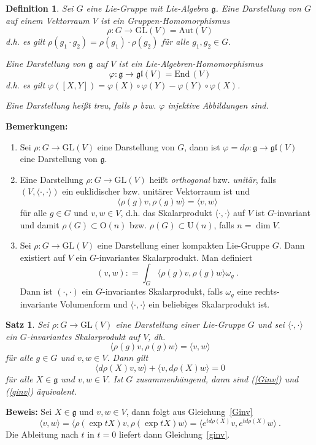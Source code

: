 \documentclass[12pt,a4paper]{article}
\def\O{\mathrm{O}}
\def\GL{\mathrm{GL}}
\def\U{\mathrm{U}}
\def\End{\mathrm{End}\,}
\def\g{\mathfrak{g}}
\def\Aut{\mathrm{Aut}}
\def\la{\langle}
\def\ra{\rangle}
\def\gl{\mathfrak{gl}}
\newtheorem{Satz}[Lemma]{Satz}
\newtheorem{Definition}[Lemma]{Definition}
\def\proof{\noindent\textbf{Beweis:}\quad}
\begin{document}
\bigskip

\begin{Definition}
Sei $G$ eine Lie-Gruppe mit Lie-Algebra $\g$. Eine {\em Darstellung von $G$} auf einem Vektorraum
$V$ ist ein Gruppen-Homomorphismus
$$
\rho : G \rightarrow \GL(V) = \Aut(V)
$$
d.h. es gilt $\rho (g_1 \cdot g_2) = \rho(g_1)\cdot \rho(g_2)$ f\"ur alle $g_1, g_2 \in G.$

\medskip

Eine {\em Darstellung von $\g$} auf $V$ ist ein Lie-Algebren-Homomorphismus
$$
\varphi : \g \rightarrow \gl(V) = \End(V)
$$
d.h. es gilt $\varphi([X,Y]) = \varphi(X) \circ \varphi(Y) - \varphi(Y) \circ \varphi(X) $.

\medskip

Eine Darstellung hei\ss t {\em treu}, falls $\rho$ bzw. $\varphi$ injektive Abbildungen sind.
\end{Definition}

\bigskip

{\bf Bemerkungen:}
\begin{enumerate}
\item
Sei $\rho : G \rightarrow \GL(V)$ eine Darstellung von $G$, dann ist $\varphi = d\rho :
\g  \rightarrow \gl(V)$ eine Darstellung von $\g$.
\item
Eine Darstellung $\rho : G \rightarrow \GL(V)$ hei\ss t {\it orthogonal} bzw. {\it unit\"ar},
falls $(V, \la \cdot, \cdot \ra)$ ein euklidischer bzw. unit\"arer Vektorraum ist und
$$
\la \rho(g)v, \rho(g)w\ra = \la v, w\ra
$$
f\"ur alle $g\in G$ und $v, w \in V$, d.h. das Skalarprodukt $\la \cdot, \cdot \ra$ auf $V$
 ist $G$-invariant und damit
$\rho(G) \subset \O(n)$ bzw. $\rho(G) \subset \U(n)$, falls $n = \dim V$.
\item
Sei $\rho : G \rightarrow \GL(V)$ eine Darstellung einer kompakten Lie-Gruppe $G$. Dann existiert
auf $V$ ein $G$-invariantes Skalarprodukt. Man definiert
$$
(v,w): = \int_G \la \rho(g)v, \rho(g)w\ra \omega_g \ .
$$
Dann ist $(\cdot, \cdot)$ ein $G$-invariantes Skalarprodukt, falls $\omega_g$ eine rechts-invariante
Volumenform und $\la \cdot, \cdot \ra$ ein beliebiges Skalarprodukt ist.
\end{enumerate}

\bigskip

\begin{Satz}\label{skalar}
Sei $\rho : G \rightarrow \GL(V)$ eine Darstellung einer Lie-Gruppe $G$ und sei
$\la \cdot, \cdot \ra$  ein $G$-invariantes Skalarprodukt auf $V$, dh.
\begin{equation}\label{Ginv}
\la \rho(g)v, \rho(g)w\ra = \la v, w\ra
\end{equation}
f\"ur alle $g\in G$ und $v, w \in V$. Dann gilt
\begin{equation}\label{ginv}
\la d\rho(X)v, w\ra +  \la v, d\rho(X)w \ra = 0
\end{equation}
f\"ur alle $X\in \g$ und $v, w \in V$. Ist $G$ zusammenh\"angend, dann sind
(\ref{Ginv}) und (\ref{ginv}) \"aquivalent.
\end{Satz}
\proof
Sei $X\in \g$ und $v, w \in V$, dann folgt aus Gleichung~\ref{Ginv}
$$
\la v, w \ra = \la \rho(\exp tX)v, \rho(\exp tX )w \ra
=
\la e^{td\rho(X)}v, e^{td\rho(X)} w \ra \ .
$$
Die Ableitung nach $t$ in $t=0$ liefert dann Gleichung~\ref{ginv}.
\end{document}

